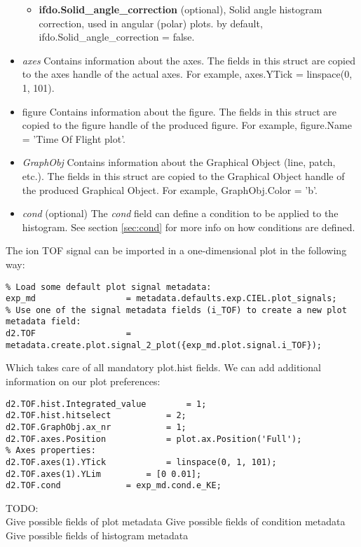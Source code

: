 \begin{itemize}
\begin{itemize}
		\item \textbf{ifdo.Solid\_angle\_correction} 	(optional), Solid angle histogram correction, used in angular (polar) plots. by default, ifdo.Solid\_angle\_correction = false.
	\end{itemize}
\item \textit{axes} 	Contains information about the axes. The fields in this struct are copied to the axes handle of the actual axes. For example, axes.YTick	= linspace(0, 1, 101).
\item figure 	Contains information about the figure. The fields in this struct are copied to the figure handle of the produced figure. For example, figure.Name = 'Time Of Flight plot'.
\item \textit{GraphObj} 	Contains information about the Graphical Object (line, patch, etc.). The fields in this struct are copied to the Graphical Object handle of the produced Graphical Object. For example, GraphObj.Color = 'b'.
\item \textit{cond} 	(optional) The \emph{cond} field can define a condition to be applied to the histogram. See section \ref{sec:cond} for more info on how conditions are defined.
\end{itemize}

The ion TOF signal can be imported in a one-dimensional plot in the following way:

\begin{lstlisting}
% Load some default plot signal metadata:
exp_md 					= metadata.defaults.exp.CIEL.plot_signals;
% Use one of the signal metadata fields (i_TOF) to create a new plot metadata field:
d2.TOF					= metadata.create.plot.signal_2_plot({exp_md.plot.signal.i_TOF});
\end{lstlisting}

Which takes care of all mandatory plot.hist fields. We can add additional information on our plot preferences:

\begin{lstlisting}
d2.TOF.hist.Integrated_value		= 1;
d2.TOF.hist.hitselect			= 2;
d2.TOF.GraphObj.ax_nr			= 1;
d2.TOF.axes.Position			= plot.ax.Position('Full');
% Axes properties:
d2.TOF.axes(1).YTick			= linspace(0, 1, 101);
d2.TOF.axes(1).YLim			= [0 0.01];
d2.TOF.cond				= exp_md.cond.e_KE;
\end{lstlisting}


TODO:\\
Give possible fields of plot metadata
Give possible fields of condition metadata
Give possible fields of histogram metadata
